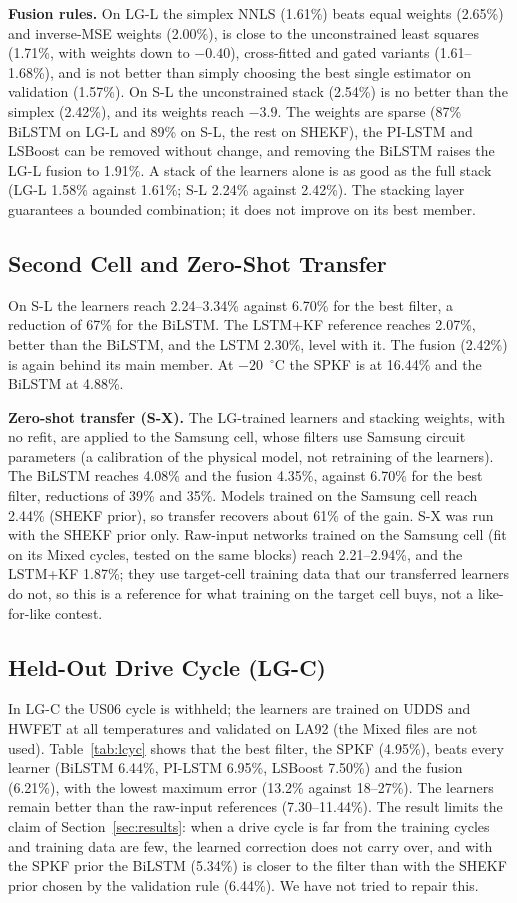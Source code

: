 \documentclass[journal]{IEEEtran}
\begin{document}
\textbf{Fusion rules.} On LG-L the simplex NNLS (1.61\%) beats equal weights (2.65\%) and inverse-MSE weights (2.00\%), is close to the unconstrained least squares (1.71\%, with weights down to $-0.40$), cross-fitted and gated variants (1.61--1.68\%), and is not better than simply choosing the best single estimator on validation (1.57\%). On S-L the unconstrained stack (2.54\%) is no better than the simplex (2.42\%), and its weights reach $-3.9$. The weights are sparse (87\% BiLSTM on LG-L and 89\% on S-L, the rest on SHEKF), the PI-LSTM and LSBoost can be removed without change, and removing the BiLSTM raises the LG-L fusion to 1.91\%. A stack of the learners alone is as good as the full stack (LG-L 1.58\% against 1.61\%; S-L 2.24\% against 2.42\%). The stacking layer guarantees a bounded combination; it does not improve on its best member.

\subsection{Second Cell and Zero-Shot Transfer}
On S-L the learners reach 2.24--3.34\% against 6.70\% for the best filter, a reduction of 67\% for the BiLSTM. The LSTM+KF reference reaches 2.07\%, better than the BiLSTM, and the LSTM 2.30\%, level with it. The fusion (2.42\%) is again behind its main member. At $-20$~$^\circ$C the SPKF is at 16.44\% and the BiLSTM at 4.88\%.

\textbf{Zero-shot transfer (S-X).} The LG-trained learners and stacking weights, with no refit, are applied to the Samsung cell, whose filters use Samsung circuit parameters (a calibration of the physical model, not retraining of the learners). The BiLSTM reaches 4.08\% and the fusion 4.35\%, against 6.70\% for the best filter, reductions of 39\% and 35\%. Models trained on the Samsung cell reach 2.44\% (SHEKF prior), so transfer recovers about 61\% of the gain. S-X was run with the SHEKF prior only. Raw-input networks trained on the Samsung cell (fit on its Mixed cycles, tested on the same blocks) reach 2.21--2.94\%, and the LSTM+KF 1.87\%; they use target-cell training data that our transferred learners do not, so this is a reference for what training on the target cell buys, not a like-for-like contest.

\subsection{Held-Out Drive Cycle (LG-C)}
In LG-C the US06 cycle is withheld; the learners are trained on UDDS and HWFET at all temperatures and validated on LA92 (the Mixed files are not used). Table~\ref{tab:lcyc} shows that the best filter, the SPKF (4.95\%), beats every learner (BiLSTM 6.44\%, PI-LSTM 6.95\%, LSBoost 7.50\%) and the fusion (6.21\%), with the lowest maximum error (13.2\% against 18--27\%). The learners remain better than the raw-input references (7.30--11.44\%). The result limits the claim of Section~\ref{sec:results}: when a drive cycle is far from the training cycles and training data are few, the learned correction does not carry over, and with the SPKF prior the BiLSTM (5.34\%) is closer to the filter than with the SHEKF prior chosen by the validation rule (6.44\%). We have not tried to repair this.
\end{document}
